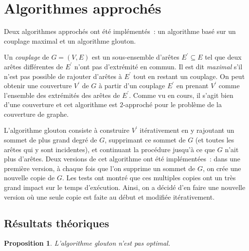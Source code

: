 \documentclass[a4paper,11pt]{amsart}
\theoremstyle{plain}
\newtheorem*{prop}{Proposition}
\begin{document}
\section{Algorithmes approchés}
\label{SecAlgoApprox}

Deux algorithmes approchés ont été implémentés~: un algorithme basé sur un couplage maximal et un algorithme glouton.

Un \emph{couplage} de $G = (V, E)$ est un sous-ensemble d'arêtes $E^\prime \subseteq E$ tel que deux arêtes différentes de $E^\prime$ n'ont pas d'extrémité en commun. Il est dit \emph{maximal} s'il n'est pas possible de rajouter d'arêtes à $E^\prime$ tout en restant un couplage. On peut obtenir une couverture $V^\prime$ de $G$ à partir d'un couplage $E^\prime$ en prenant $V^\prime$ comme l'ensemble des extrémités des arêtes de $E^\prime$. Comme vu en cours, il s'agit bien d'une couverture et cet algorithme est $2$-approché pour le problème de la couverture de graphe.

L'algorithme glouton consiste à construire $V^\prime$ itérativement en y rajoutant un sommet de plus grand degré de $G$, supprimant ce sommet de $G$ (et toutes les arêtes qui y sont incidentes), et continuant la procédure jusqu'à ce que $G$ n'ait plus d'arêtes. Deux versions de cet algorithme ont été implémentées~: dans une première version, à chaque fois que l'on supprime un sommet de $G$, on crée une nouvelle copie de $G$. Les tests ont montré que ces multiples copies ont un très grand impact sur le temps d'exécution. Ainsi, on a décidé d'en faire une nouvelle version où une seule copie est faite au début et modifiée itérativement.

\subsection{Résultats théoriques}
\label{AlgoApproxTheorique}

\begin{prop}
L'algorithme glouton n'est pas optimal.
\end{prop}
\end{document}
